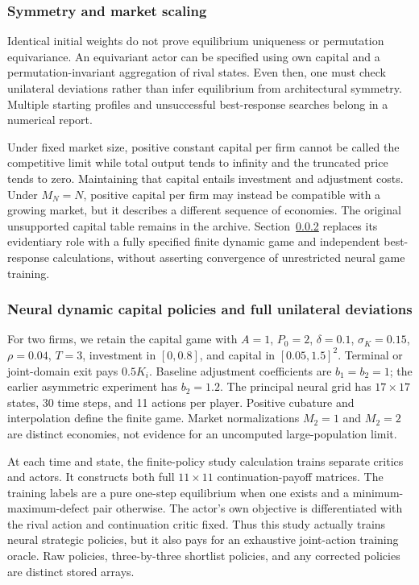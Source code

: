 \documentclass[ecta,nameyear,draft]{econsocart}
\theoremstyle{definition}
\theoremstyle{remark}
\begin{document}
\subsubsection{Symmetry and market scaling}
Identical initial weights do not prove equilibrium uniqueness or permutation equivariance. An equivariant actor can be specified using own capital and a permutation-invariant aggregation of rival states. Even then, one must check unilateral deviations rather than infer equilibrium from architectural symmetry. Multiple starting profiles and unsuccessful best-response searches belong in a numerical report.

Under fixed market size, positive constant capital per firm cannot be called the competitive limit while total output tends to infinity and the truncated price tends to zero. Maintaining that capital entails investment and adjustment costs. Under $M_N=N$, positive capital per firm may instead be compatible with a growing market, but it describes a different sequence of economies. The original unsupported capital table remains in the archive. Section~\ref{sec:dynamic-computation} replaces its evidentiary role with a fully specified finite dynamic game and independent best-response calculations, without asserting convergence of unrestricted neural game training.


\subsubsection{Neural dynamic capital policies and full unilateral deviations}\label{sec:dynamic-computation}
For two firms, we retain the capital game with $A=1$, $P_0=2$, $\delta=0.1$, $\sigma_K=0.15$, $\rho=0.04$, $T=3$, investment in $[0,0.8]$, and capital in $[0.05,1.5]^2$. Terminal or joint-domain exit pays $0.5K_i$. Baseline adjustment coefficients are $b_1=b_2=1$; the earlier asymmetric experiment has $b_2=1.2$. The principal neural grid has $17\times17$ states, 30 time steps, and 11 actions per player. Positive cubature and interpolation define the finite game. Market normalizations $M_2=1$ and $M_2=2$ are distinct economies, not evidence for an uncomputed large-population limit.

At each time and state, the finite-policy study calculation trains separate critics and actors. It constructs both full $11\times11$ continuation-payoff matrices. The training labels are a pure one-step equilibrium when one exists and a minimum-maximum-defect pair otherwise. The actor's own objective is differentiated with the rival action and continuation critic fixed. Thus this study actually trains neural strategic policies, but it also pays for an exhaustive joint-action training oracle. Raw policies, three-by-three shortlist policies, and any corrected policies are distinct stored arrays.
\end{document}
